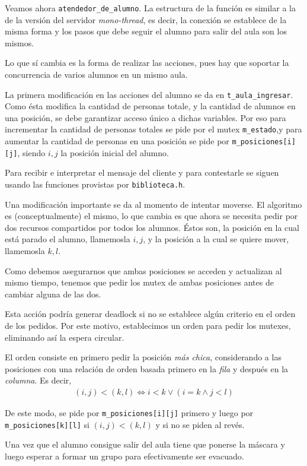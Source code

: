 \documentclass[a4paper]{article}
\begin{document}
Veamos ahora \verb|atendedor_de_alumno|. La estructura de la función es
similar a la de la versión del servidor \textit{mono-thread}, es decir,
la conexión se establece de la misma forma y los pasos que debe seguir el
alumno para salir del aula son los mismos.

Lo que sí cambia es la forma de realizar las acciones, pues hay que soportar
la concurrencia de varios alumnos en un mismo aula.

La primera modificación en las acciones del alumno se da en
\verb|t_aula_ingresar|. Como ésta modifica la cantidad de personas
totale, y la cantidad de alumnos en una posición, se debe garantizar acceso
único a dichas variables. Por eso para incrementar la cantidad de personas
totales se pide por el mutex \verb|m_estado|,y para aumentar la cantidad
de personas en una posición se pide por \verb|m_posiciones[i][j]|, siendo
$i, j$ la posición inicial del alumno.

Para recibir e interpretar el mensaje del cliente y para contestarle se siguen
usando las funciones provistas por \verb|biblioteca.h|.

Una modificación importante se da al momento de intentar moverse. El
algoritmo es (conceptualmente) el mismo, lo que cambia es que ahora se
necesita pedir por dos recursos compartidos por todos los alumnos. Éstos
son, la posición en la cual está parado el alumno, llamemosla $i, j$, y la
posición a la cual se quiere mover, llamemosla $k, l$.

Como debemos asegurarnos que ambas posiciones se acceden y actualizan al
mismo tiempo, tenemos que pedir los mutex de ambas posiciones antes de cambiar
alguna de las dos.

Esta acción podría generar deadlock si no se establece algún criterio en el
orden de los pedidos. Por este motivo, establecimos un orden para pedir los
mutexes, eliminando así la espera circular.

El orden consiste en primero pedir la posición \textit{más chica},
considerando a las posiciones con una relación de orden basada primero en la
\textit{fila} y después en la \textit{columna}. Es decir,
\begin{align*}
  (i, j) < (k, l) \iff i < k \lor (i = k \land j < l)
\end{align*}

De este modo, se pide por \verb|m_posiciones[i][j]| primero y luego por
\verb|m_posiciones[k][l]| si $(i, j) < (k, l)$ y si no se piden al revés.

Una vez que el alumno consigue salir del aula tiene que ponerse la máscara y
luego esperar a formar un grupo para efectivamente ser evacuado.
\end{document}
